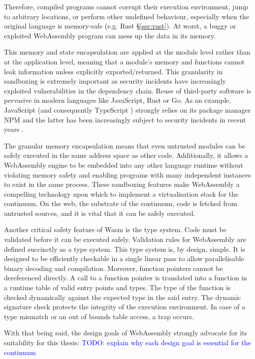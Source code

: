 Therefore, compiled programs cannot corrupt their execution environment, jump to arbitrary locations, or perform other undefined behaviour, especially when the original language is memory-safe (e.g. Rust §\ref{sec:rust}). At worst, a buggy or exploited WebAssembly program can mess up the data in its memory.

This memory and state encapsulation are applied at the module level rather than at the application level, meaning that a module's memory and functions cannot leak information unless explicitly exported/returned. This granularity in sandboxing is extremely important as security incidents have increasingly exploited vulnerabilities in the dependency chain. Reuse of third-party software is pervasive in modern languages like JavaScript, Rust or Go. As an example, JavaScript (and consequently TypeScript \cite{typescript}) strongly relies on its package manager NPM and the latter has been increasingly subject to security incidents in recent years \cite{npm-security}.

The granular memory encapsulation means that even untrusted modules can be safely executed in the same address space as other code. Additionally, it allows a WebAssembly engine to be embedded into any other language runtime without violating memory safety and enabling programs with many independent instances to exist in the same process. These sandboxing features make WebAssembly a compelling technology upon which to implement a virtualisation stack for the continuum. On the web, the substrate of the continuum, code is fetched from untrusted sources, and it is vital that it can be safely executed.

Another critical safety feature of Wasm is the type system. Code must be validated before it can be executed safely. Validation rules for WebAssembly are defined succinctly as a type system. This type system is, by design, simple. It is designed to be efficiently checkable in a single linear pass to allow parallelisable binary decoding and compilation.
Moreover, function pointers cannot be dereferenced directly. A call to a function pointer is translated into a function in a runtime table of valid entry points and types. The type of the function is checked dynamically against the expected type in the said entry. The dynamic signature check protects the integrity of the execution environment. In case of a type mismatch or an out of bounds table access, a trap occurs.

With that being said, the design goals of WebAssembly strongly advocate for its suitability for this thesis: \textcolor{blue}{TODO: explain why each design goal is essential for the continuum}

